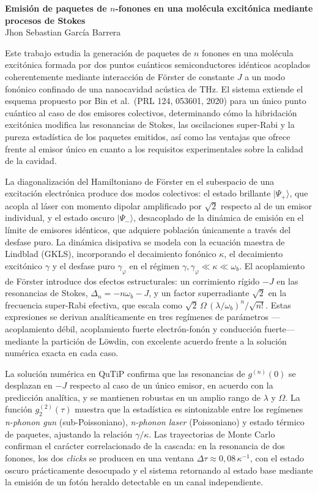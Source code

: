 \documentclass[12pt, letterpaper]{article}
\begin{document}
{\noindent\large\bfseries Emisión de paquetes de $n$-fonones en una molécula excitónica mediante procesos de Stokes}\\[2pt]
{\noindent Jhon Sebastian García Barrera}

\bigskip

Este trabajo estudia la generación de paquetes de $n$ fonones en una molécula excitónica formada
por dos puntos cuánticos semiconductores idénticos acoplados coherentemente mediante interacción de
Förster de constante $J$ a un modo fonónico confinado de una nanocavidad acústica de THz. El
sistema extiende el esquema propuesto por Bin et al.\ (PRL 124, 053601, 2020) para un único punto
cuántico al caso de dos emisores colectivos, determinando cómo la hibridación excitónica modifica
las resonancias de Stokes, las oscilaciones super-Rabi y la pureza estadística de los paquetes
emitidos, así como las ventajas que ofrece frente al emisor único en cuanto a los requisitos
experimentales sobre la calidad de la cavidad.

La diagonalización del Hamiltoniano de Förster en el subespacio de una excitación electrónica
produce dos modos colectivos: el estado brillante $|\Psi_+\rangle$, que acopla al láser con momento
dipolar amplificado por $\sqrt{2}$ respecto al de un emisor individual, y el estado oscuro
$|\Psi_-\rangle$, desacoplado de la dinámica de emisión en el límite de emisores idénticos, que
adquiere población únicamente a través del desfase puro. La dinámica disipativa se modela con la
ecuación maestra de Lindblad (GKLS), incorporando el decaimiento fonónico $\kappa$, el decaimiento
excitónico $\gamma$ y el desfase puro $\gamma_\varphi$ en el régimen
$\gamma, \gamma_\varphi \ll \kappa \ll \omega_b$. El acoplamiento de Förster introduce dos efectos
estructurales: un corrimiento rígido $-J$ en las resonancias de Stokes,
$\Delta_n = -n\omega_b - J$, y un factor superradiante $\sqrt{2}$ en la frecuencia super-Rabi
efectiva, que escala como $\sqrt{2}\,\Omega\,(\lambda/\omega_b)^n/\sqrt{n!}$. Estas expresiones se
derivan analíticamente en tres regímenes de parámetros ---acoplamiento débil, acoplamiento fuerte
electrón-fonón y conducción fuerte--- mediante la partición de Löwdin, con excelente acuerdo frente
a la solución numérica exacta en cada caso.

La solución numérica en QuTiP confirma que las resonancias de $g^{(n)}(0)$ se desplazan en $-J$
respecto al caso de un único emisor, en acuerdo con la predicción analítica, y se mantienen robustas
en un amplio rango de $\lambda$ y $\Omega$. La función $g_2^{(2)}(\tau)$ muestra que la estadística
es sintonizable entre los regímenes \textit{n-phonon gun} (sub-Poissoniano), \textit{n-phonon laser}
(Poissoniano) y estado térmico de paquetes, ajustando la relación $\gamma/\kappa$. Las trayectorias
de Monte Carlo confirman el carácter correlacionado de la cascada: en la resonancia de dos fonones,
los dos \textit{clicks} se producen en una ventana $\Delta\tau \approx 0{,}08\,\kappa^{-1}$, con el
estado oscuro prácticamente desocupado y el sistema retornando al estado base mediante la emisión de
un fotón heraldo detectable en un canal independiente.
\end{document}
